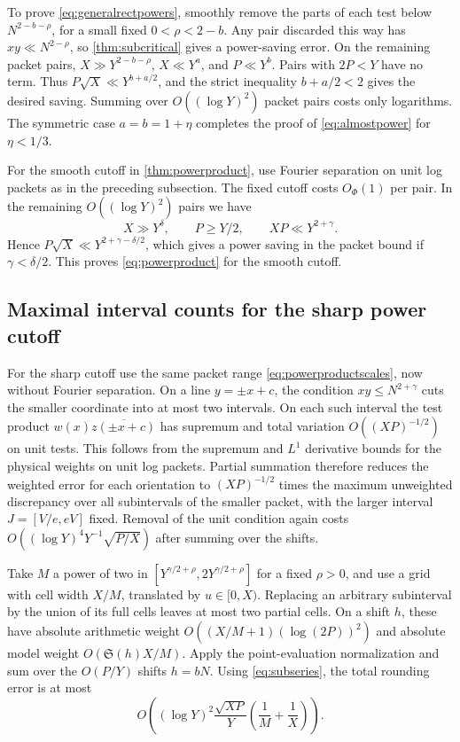 \documentclass[11pt,a4paper]{article}
\numberwithin{equation}{section}
\newcommand{\SSS}{\mathfrak S}
\begin{document}
To prove \eqref{eq:generalrectpowers}, smoothly remove
the parts of each test below $N^{2-b-\rho}$, for a small
fixed $0<\rho<2-b$. Any pair discarded this way has
$xy\ll N^{2-\rho}$, so \cref{thm:subcritical} gives a
power-saving error. On the remaining packet pairs,
$X\gg Y^{2-b-\rho}$, $X\ll Y^a$, and $P\ll Y^b$.
Pairs with $2P<Y$ have no term. Thus
$P\sqrt X\ll Y^{b+a/2}$, and the strict inequality
$b+a/2<2$ gives the desired saving. Summing over
$O((\log Y)^2)$ packet pairs costs only logarithms.
The symmetric case $a=b=1+\eta$ completes the proof of
\cref{eq:almostpower} for $\eta<1/3$.

For the smooth cutoff in \cref{thm:powerproduct}, use
Fourier separation on unit log packets as in the preceding
subsection. The fixed cutoff costs $O_\Phi(1)$ per pair.
In the remaining $O((\log Y)^2)$ pairs we have
\begin{equation}
 X\gg Y^\delta,\qquad P\ge Y/2,\qquad XP\ll Y^{2+\gamma}.
 \label{eq:powerproductscales}
\end{equation}
Hence $P\sqrt X\ll Y^{2+\gamma-\delta/2}$, which gives a
power saving in the packet bound if $\gamma<\delta/2$.
This proves \cref{eq:powerproduct} for the smooth cutoff.

\subsection{Maximal interval counts for the sharp power cutoff}

For the sharp cutoff use the same packet range
\cref{eq:powerproductscales}, now without Fourier separation.
On a line $y=\pm x+c$, the condition $xy\le N^{2+\gamma}$
cuts the smaller coordinate into at most two intervals.
On each such interval the test product
$w(x)\overline{z(\pm x+c)}$ has supremum and total
variation $O((XP)^{-1/2})$ on unit tests. This follows
from the supremum and $L^1$ derivative bounds for the
physical weights on unit log packets. Partial summation
therefore reduces the weighted error for each orientation
to $(XP)^{-1/2}$ times the maximum unweighted discrepancy
over all subintervals of the smaller packet, with the
larger interval $J=[V/e,eV]$ fixed. Removal of the unit
condition again costs $O((\log Y)^4Y^{-1}\sqrt{P/X})$
after summing over the shifts.

Take $M$ a power of two in
$[Y^{\gamma/2+\rho},2Y^{\gamma/2+\rho}]$ for a fixed $\rho>0$,
and use a grid with cell width $X/M$, translated by
$u\in[0,X)$. Replacing an arbitrary
subinterval by the union of its full cells leaves at most
two partial cells. On a shift $h$, these have absolute
arithmetic weight $O((X/M+1)(\log(2P))^2)$ and absolute
model weight $O(\SSS(h)X/M)$. Apply the point-evaluation
normalization and sum over the $O(P/Y)$ shifts $h=bN$.
Using \cref{eq:subseries}, the total rounding error is
at most
\begin{equation}
 O\!\left((\log Y)^2\frac{\sqrt{XP}}Y
              \left(\frac1M+\frac1X\right)\right).
 \label{eq:sharprounding}
\end{equation}
\end{document}
